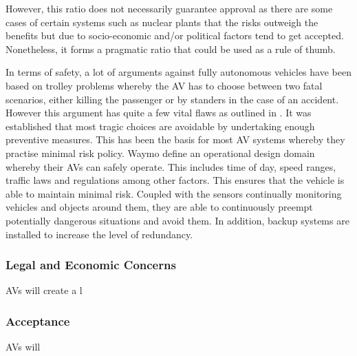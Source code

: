 However, this ratio does not necessarily guarantee approval as there are some cases of certain systems such as nuclear plants that the risks outweigh the benefits but due to socio-economic and/or political factors tend to get accepted. Nonetheless, it forms a pragmatic ratio that could be used as a rule of thumb.

In terms of safety, a lot of arguments against fully autonomous vehicles have been based on trolley problems whereby the AV has to choose between two fatal scenarios, either killing the passenger or by standers in the case of an accident. However this argument has quite a few vital flaws as outlined in \cite{fried2012does}. It was established that most tragic choices are avoidable by undertaking enough preventive measures. This has been the basis for most AV systems whereby they practise minimal risk policy.  Waymo define an operational design domain whereby their AVs can safely operate. This includes time of day, speed ranges, traffic laws and regulations among other factors\cite{waymo_2018}. This ensures that the vehicle is able to maintain minimal risk. Coupled with the sensors continually monitoring vehicles and objects around them, they are able to continuously preempt potentially dangerous situations and avoid them. In addition, backup systems are installed to increase the level of redundancy.
\subsubsection{Legal and Economic Concerns}

AVs will create a l


\subsubsection{Acceptance }

AVs will 

